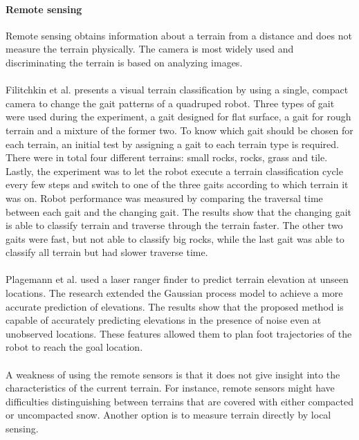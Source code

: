 \documentclass[USenglish]{ifimaster}  %
\begin{document}
\paragraph{Remote sensing}
Remote sensing obtains information about a terrain from a distance and does not measure the terrain physically. The camera is most widely used and discriminating the terrain is based on analyzing images.
\\
\\ 
Filitchkin et al. \cite{littleDog} presents a visual terrain classification by using a single, compact camera to change the gait patterns of a quadruped robot. Three types of gait were used during the experiment, a gait designed for flat surface, a gait for rough terrain and a mixture of the former two. To know which gait should be chosen for each terrain, an initial test by assigning a gait to each terrain type is required. There were in total four different terrains: small rocks, rocks, grass and tile. Lastly, the experiment was to let the robot execute a terrain classification cycle every few steps and switch to one of the three gaits according to which terrain it was on. Robot performance was measured by comparing the traversal time between each gait and the changing gait. The results show that the changing gait is able to classify terrain and traverse through the terrain faster. The other two gaits were fast, but not able to classify big rocks, while the last gait was able to classify all terrain but had slower traverse time.
\\
\\
Plagemann et al. \cite{4651026} used a laser ranger finder to predict terrain elevation at unseen locations. The research extended the Gaussian process model to achieve a more accurate prediction of elevations. The results show that the proposed method is capable of accurately predicting elevations in the presence of noise even at unobserved locations. These features allowed them to plan foot trajectories of the robot to reach the goal location.  
\\
\\
A weakness of using the remote sensors is that it does not give insight into the characteristics of the current terrain. For instance, remote sensors might have difficulties distinguishing between terrains that are covered with either compacted or uncompacted snow. Another option is to measure terrain directly by local sensing.
	
\end{document}
